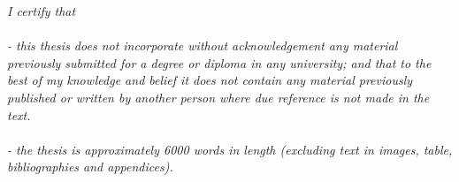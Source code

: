 
\begin{declaration}
\textit{
I certify that\\ \\
- this thesis does not incorporate without acknowledgement any material previously submitted for a degree or
diploma in any university; and that to the best of my knowledge and belief it does not contain any material
previously published or written by another person where due reference is not made in the text.\\ \\
- the thesis is approximately 6000 words in length (excluding text in images, table, bibliographies and appendices).\\ \\}



\end{declaration}

